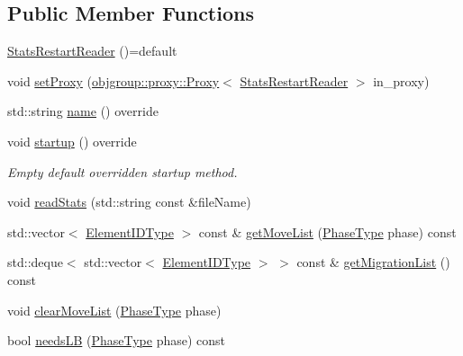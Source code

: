 \subsection*{Public Member Functions}
\begin{DoxyCompactItemize}
\item 
\hyperlink{structvt_1_1vrt_1_1collection_1_1balance_1_1_stats_restart_reader_a6813a4a484008c90cc12fb384e20f8c1}{Stats\+Restart\+Reader} ()=default
\item 
void \hyperlink{structvt_1_1vrt_1_1collection_1_1balance_1_1_stats_restart_reader_a17174042c0a87d1915ecb59315b09d52}{set\+Proxy} (\hyperlink{structvt_1_1objgroup_1_1proxy_1_1_proxy}{objgroup\+::proxy\+::\+Proxy}$<$ \hyperlink{structvt_1_1vrt_1_1collection_1_1balance_1_1_stats_restart_reader}{Stats\+Restart\+Reader} $>$ in\+\_\+proxy)
\item 
std\+::string \hyperlink{structvt_1_1vrt_1_1collection_1_1balance_1_1_stats_restart_reader_abb3373c0dd6e58b2089d9587cba71825}{name} () override
\item 
void \hyperlink{structvt_1_1vrt_1_1collection_1_1balance_1_1_stats_restart_reader_a0a2bd4e4f989766216237d6aedfaaa51}{startup} () override
\begin{DoxyCompactList}\small\item\em Empty default overridden startup method. \end{DoxyCompactList}\item 
void \hyperlink{structvt_1_1vrt_1_1collection_1_1balance_1_1_stats_restart_reader_a8eeb8ec940e2bd7e7e41bccf2462a4d6}{read\+Stats} (std\+::string const \&file\+Name)
\item 
std\+::vector$<$ \hyperlink{namespacevt_1_1vrt_1_1collection_1_1balance_a14c8d2c972f2913aa3f1636e5be0a120}{Element\+I\+D\+Type} $>$ const  \& \hyperlink{structvt_1_1vrt_1_1collection_1_1balance_1_1_stats_restart_reader_aa2fcd261c5a729969bb5cafa4b628bdc}{get\+Move\+List} (\hyperlink{namespacevt_a46ce6733d5cdbd735d561b7b4029f6d7}{Phase\+Type} phase) const
\item 
std\+::deque$<$ std\+::vector$<$ \hyperlink{namespacevt_1_1vrt_1_1collection_1_1balance_a14c8d2c972f2913aa3f1636e5be0a120}{Element\+I\+D\+Type} $>$ $>$ const  \& \hyperlink{structvt_1_1vrt_1_1collection_1_1balance_1_1_stats_restart_reader_a87fa9ef4ba869acb1af6bf5066027029}{get\+Migration\+List} () const
\item 
void \hyperlink{structvt_1_1vrt_1_1collection_1_1balance_1_1_stats_restart_reader_a2904eb0019c05d60aaec8f2e40b67896}{clear\+Move\+List} (\hyperlink{namespacevt_a46ce6733d5cdbd735d561b7b4029f6d7}{Phase\+Type} phase)
\item 
bool \hyperlink{structvt_1_1vrt_1_1collection_1_1balance_1_1_stats_restart_reader_a419dd1d7c0b6d3a9fb9a1666990e5325}{needs\+LB} (\hyperlink{namespacevt_a46ce6733d5cdbd735d561b7b4029f6d7}{Phase\+Type} phase) const
\end{DoxyCompactItemize}

